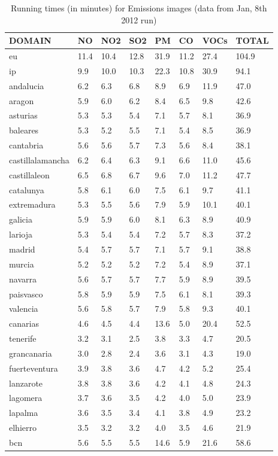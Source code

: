 \documentclass[11pt]{article}
\begin{document}
\begin{table}
\begin{center}
\begin{tabular}{llllllll}
DOMAIN & NO & NO2 & SO2 & PM & CO & VOCs &TOTAL\\
\hline\hline
eu & 11.4 & 10.4 & 12.8 & 31.9 & 11.2 & 27.4 &104.9\\
ip & 9.9 & 10.0 & 10.3 & 22.3 & 10.8 & 30.9 &94.1\\
andalucia & 6.2 & 6.3 & 6.8 & 8.9 & 6.9 & 11.9 &47.0\\
aragon & 5.9 & 6.0 & 6.2 & 8.4 & 6.5 & 9.8 &42.6\\
asturias & 5.3 & 5.3 & 5.4 & 7.1 & 5.7 & 8.1 &36.9\\
baleares & 5.3 & 5.2 & 5.5 & 7.1 & 5.4 & 8.5 &36.9\\
cantabria & 5.6 & 5.6 & 5.7 & 7.3 & 5.6 & 8.4 &38.1\\
castillalamancha & 6.2 & 6.4 & 6.3 & 9.1 & 6.6 & 11.0 &45.6\\
castillaleon & 6.5 & 6.8 & 6.7 & 9.6 & 7.0 & 11.2 &47.7\\
catalunya & 5.8 & 6.1 & 6.0 & 7.5 & 6.1 & 9.7 &41.1\\
extremadura & 5.3 & 5.5 & 5.6 & 7.9 & 5.9 & 10.1 &40.1\\
galicia & 5.9 & 5.9 & 6.0 & 8.1 & 6.3 & 8.9 &40.9\\
larioja & 5.3 & 5.4 & 5.4 & 7.2 & 5.7 & 8.3 &37.2\\
madrid & 5.4 & 5.7 & 5.7 & 7.1 & 5.7 & 9.1 &38.8\\
murcia & 5.2 & 5.2 & 5.2 & 7.2 & 5.4 & 8.9 &37.1\\
navarra & 5.6 & 5.7 & 5.7 & 7.7 & 5.9 & 8.9 &39.5\\
paisvasco & 5.8 & 5.9 & 5.9 & 7.5 & 6.1 & 8.1 &39.3\\
valencia & 5.6 & 5.8 & 5.7 & 7.9 & 5.8 & 9.3 &40.1\\
canarias & 4.6 & 4.5 & 4.4 & 13.6 & 5.0 & 20.4 &52.5\\
tenerife & 3.2 & 3.1 & 2.5 & 3.8 & 3.3 & 4.7 &20.5\\
grancanaria & 3.0 & 2.8 & 2.4 & 3.6 & 3.1 & 4.3 &19.0\\
fuerteventura & 3.9 & 3.8 & 3.6 & 4.7 & 4.2 & 5.2 &25.4\\
lanzarote & 3.8 & 3.8 & 3.6 & 4.2 & 4.1 & 4.8 &24.3\\
lagomera & 3.7 & 3.6 & 3.5 & 4.2 & 4.0 & 5.0 &23.9\\
lapalma & 3.6 & 3.5 & 3.4 & 4.1 & 3.8 & 4.9 &23.2\\
elhierro & 3.5 & 3.2 & 3.2 & 4.0 & 3.5 & 4.6 &21.9\\
bcn & 5.6 & 5.5 & 5.5 & 14.6 & 5.9 & 21.6 &58.6\\
\end{tabular}
\end{center}
\label{t:times-em}
\caption{Running times (in minutes) for Emissions images (data from Jan, 8th 2012 run)}
\end{table}
\end{document}
